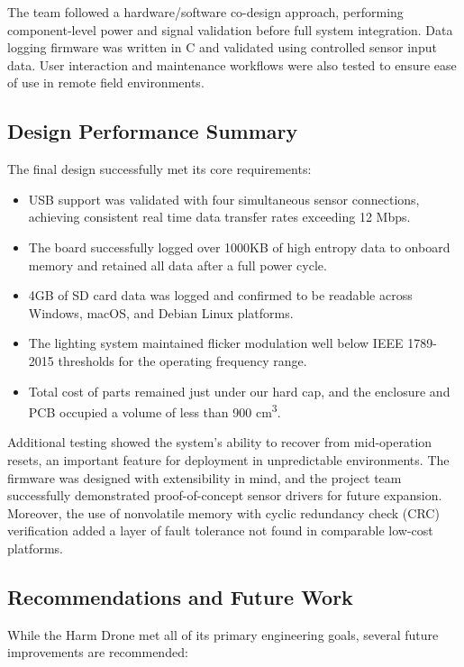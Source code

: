 \documentclass[12pt]{article}
\begin{document}
\par The team followed a hardware/software co-design approach, performing component-level power and signal validation before full system integration. Data logging firmware was written in C and validated using controlled sensor input data. User interaction and maintenance workflows were also tested to ensure ease of use in remote field environments.

\subsection{Design Performance Summary}

The final design successfully met its core requirements:

\begin{itemize}
\item USB support was validated with four simultaneous sensor connections, achieving consistent real time data transfer rates exceeding 12 Mbps.
\item The board successfully logged over 1000KB of high entropy data to onboard memory and retained all data after a full power cycle.
\item 4GB of SD card data was logged and confirmed to be readable across Windows, macOS, and Debian Linux platforms.
\item The lighting system maintained flicker modulation well below IEEE 1789-2015 thresholds for the operating frequency range.
\item Total cost of parts remained just under our hard cap, and the enclosure and PCB occupied a volume of less than 900 cm\textsuperscript{3}.
\end{itemize}

\par Additional testing showed the system’s ability to recover from mid-operation resets, an important feature for deployment in unpredictable environments. The firmware was designed with extensibility in mind, and the project team successfully demonstrated proof-of-concept sensor drivers for future expansion. Moreover, the use of nonvolatile memory with cyclic redundancy check (CRC) verification added a layer of fault tolerance not found in comparable low-cost platforms.

\subsection{Recommendations and Future Work}

While the Harm Drone met all of its primary engineering goals, several future improvements are recommended:
\end{document}

